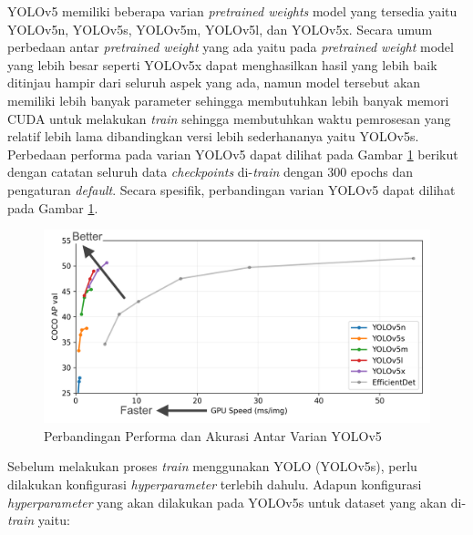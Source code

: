 YOLOv5 memiliki beberapa varian \textit{pretrained weights} model yang tersedia yaitu YOLOv5n, YOLOv5s, YOLOv5m, YOLOv5l, dan YOLOv5x. Secara umum perbedaan antar \textit{pretrained weight} yang ada yaitu pada \textit{pretrained weight} model yang lebih besar seperti YOLOv5x dapat menghasilkan hasil yang lebih baik ditinjau hampir dari seluruh aspek yang ada, namun model tersebut akan memiliki lebih banyak parameter sehingga membutuhkan lebih banyak memori CUDA untuk melakukan \textit{train} sehingga membutuhkan waktu pemrosesan yang relatif lebih lama dibandingkan versi lebih sederhananya yaitu YOLOv5s. Perbedaan performa pada varian YOLOv5 dapat dilihat pada Gambar \ref*{fig:yolov5comparison} berikut dengan catatan seluruh data \textit{checkpoints} di-\textit{train} dengan 300 epochs dan pengaturan \textit{default}. Secara spesifik, perbandingan varian YOLOv5 dapat dilihat pada Gambar \ref*{fig:yolov5comparison}. \par

\begin{figure}[H]
    \centering
    \includegraphics[scale=0.75]{gambar/yolov5comparison.png}
    \caption{Perbandingan Performa dan Akurasi Antar Varian YOLOv5 \citep*{ultralyticsyolo}}
    \label{fig:yolov5comparison}
\end{figure}

Sebelum melakukan proses \textit{train} menggunakan YOLO (YOLOv5s), perlu dilakukan konfigurasi \textit{hyperparameter} terlebih dahulu. Adapun konfigurasi \textit{hyperparameter} yang akan dilakukan pada YOLOv5s untuk dataset yang akan di-\textit{train} yaitu: \par

